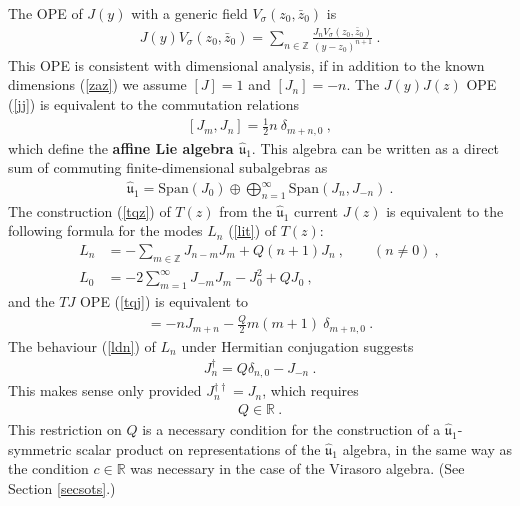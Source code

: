 \documentclass[12pt,a4paper,notitlepage]{report}
\newcommand \Z {\mathbb{Z}}
\newcommand \R {\mathbb{R}}
\numberwithin{equation}{section}
\theoremstyle{break}
\begin{document}
The OPE of $J(y)$ with a generic field $V_\sigma(z_0,\bar{z}_0)$ is 
\begin{align}
 \boxed{J(y) V_\sigma(z_0,\bar{z}_0) = \sum_{n\in \Z} \frac{J_n V_\sigma(z_0,\bar{z}_0)}{(y-z_0)^{n+1}}}\ .
\label{jvn}
\end{align}
This OPE is consistent with dimensional analysis, if in addition to the known dimensions (\ref{zaz}) we assume $[J]=1$ and $[J_n]=-n$.
The $J(y)J(z)$ OPE (\ref{jj}) is equivalent to the commutation relations
\begin{align}
 \boxed{ [J_m,J_n] =  \frac12 n\ \delta_{m+n,0}}\ ,
\label{jmjn}
\end{align}
which define the  \textbf{\boldmath affine Lie algebra $\hat{\mathfrak{u}}_1$}. This algebra can be written as a direct sum of commuting finite-dimensional subalgebras as 
\begin{align}
 \hat{\mathfrak{u}}_1 = \text{Span}(J_0) \oplus \bigoplus_{n=1}^\infty \text{Span}(J_n,J_{-n}) \ .
\end{align}
The construction (\ref{tqz}) of $T(z)$ from the $\hat{\mathfrak{u}}_1$ current $J(z)$ is equivalent to the following formula for the modes $L_n$ (\ref{lit}) of $T(z)$:
\begin{align}
 L_n &= -\sum_{m\in\Z} J_{n-m}J_m + Q(n+1)J_n\ , \qquad (n\neq 0)\ ,
\label{lnj}
\\
L_0 &=-2\sum_{m=1}^\infty J_{-m}J_m -J_0^2+QJ_0 \ ,
\label{lzj}
\end{align}
and the $TJ$ OPE (\ref{tqj}) is equivalent to 
\begin{align}
 [L_m,J_n] = -nJ_{m+n} -\frac{Q}{2}m(m+1)\ \delta_{m+n,0} \ . 
\end{align}
The behaviour (\ref{ldn}) of $L_n$ under Hermitian conjugation suggests 
\begin{align}
 J_n^\dagger = Q\delta_{n,0}-J_{-n}\ .
\label{jdq}
\end{align}
This makes sense only provided $J_n^{\dagger \dagger} =J_n$, which requires 
\begin{align}
 Q \in \R \ .
\label{qir}
\end{align}
This restriction on $Q$ is a necessary condition for the construction of a $\hat{\mathfrak{u}}_1$-symmetric scalar product on representations of the $\hat{\mathfrak{u}}_1$ algebra, in the same way as the condition $c\in \R$ was necessary in the case of the Virasoro algebra. (See Section \ref{secsots}.)
\end{document}
